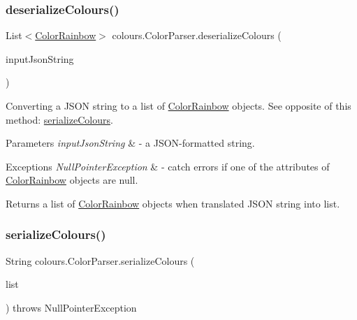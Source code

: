 \subsubsection{\texorpdfstring{deserialize\+Colours()}{deserializeColours()}}
{\footnotesize\ttfamily List$<$\hyperlink{classcolours_1_1_color_rainbow}{Color\+Rainbow}$>$ colours.\+Color\+Parser.\+deserialize\+Colours (\begin{DoxyParamCaption}\item[{String}]{input\+Json\+String }\end{DoxyParamCaption})\hspace{0.3cm}{\ttfamily [inline]}}

Converting a J\+S\+ON string to a list of \hyperlink{classcolours_1_1_color_rainbow}{Color\+Rainbow} objects. See opposite of this method\+: \hyperlink{classcolours_1_1_color_parser_a3a8b5f6c8bd9045b63fd8e162f3c96d3}{serialize\+Colours}. 
\begin{DoxyParams}{Parameters}
{\em input\+Json\+String} & -\/ a J\+S\+O\+N-\/formatted string. \\
\hline
\end{DoxyParams}

\begin{DoxyExceptions}{Exceptions}
{\em Null\+Pointer\+Exception} & -\/ catch errors if one of the attributes of \hyperlink{classcolours_1_1_color_rainbow}{Color\+Rainbow} objects are null. \\
\hline
\end{DoxyExceptions}
\begin{DoxyReturn}{Returns}
a list of \hyperlink{classcolours_1_1_color_rainbow}{Color\+Rainbow} objects when translated J\+S\+ON string into list. 
\end{DoxyReturn}
\mbox{\label{classcolours_1_1_color_parser_a3a8b5f6c8bd9045b63fd8e162f3c96d3}} 
\subsubsection{\texorpdfstring{serialize\+Colours()}{serializeColours()}}
{\footnotesize\ttfamily String colours.\+Color\+Parser.\+serialize\+Colours (\begin{DoxyParamCaption}\item[{List$<$ \hyperlink{classcolours_1_1_color_rainbow}{Color\+Rainbow} $>$}]{list }\end{DoxyParamCaption}) throws Null\+Pointer\+Exception\hspace{0.3cm}{\ttfamily [inline]}}

